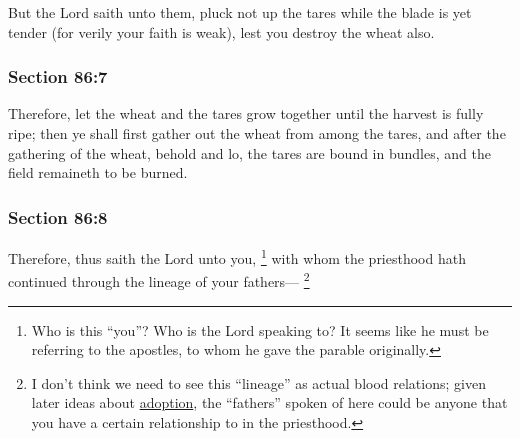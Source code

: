 		But the Lord saith unto them, pluck not up the tares while the blade is yet tender (for verily your faith is weak), lest you destroy the wheat also.


	\subsubsection{Section 86:7} %
		\label{DC86-7}

		Therefore, let the wheat and the tares grow together until the harvest is fully ripe; then ye shall first gather out the wheat from among the tares, and after the gathering of the wheat, behold and lo, the tares are bound in bundles, and the field remaineth to be burned.


	\subsubsection{Section 86:8} %
		\label{DC86-8}

		Therefore, thus saith the Lord unto you,%
			\footnote{%
				Who is this ``you''? Who is the Lord speaking to? It seems like he must be referring to the apostles, to whom he gave the parable originally.
				}
		with whom the priesthood hath continued through the lineage of your fathers---%
			\footnote{%
				I don't think we need to see this ``lineage'' as actual blood relations; given later ideas about \hyperref[ADOPTION]{adoption}, the ``fathers'' spoken of here could be anyone that you have a certain relationship to in the priesthood.
				}

